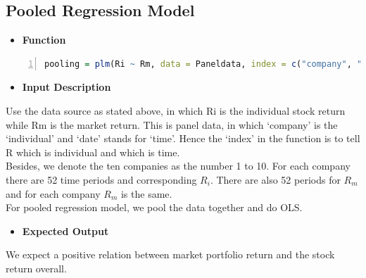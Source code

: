     \subsection{Pooled Regression Model}
    \begin{itemize}
    \item \textbf{Function}
    \end{itemize}
    \begin{lstlisting}[language=R,numbers=left, numberstyle=\normalsize]
    pooling = plm(Ri ~ Rm, data = Paneldata, index = c("company", "date"), model = "pooling")
    \end{lstlisting}
    \begin{itemize}
    \item \textbf{Input Description}
    \end{itemize}
    \noindent Use the data source as stated above, in which Ri is the individual stock return while Rm is the market return. This is panel data, in which `company' is the `individual' and `date' stands for `time'. Hence the `index' in the function is to tell R which is individual and which is time.\\

    Besides, we denote the ten companies as the number 1 to 10. For each company there are 52 time periods and corresponding $R_{i}$. There are also 52 periods for $R_{m}$ and for each company $R_{m}$ is the same.\\

    For pooled regression model, we pool the data together and do OLS.\\


    \begin{itemize}
    \item \textbf{Expected Output}
    \end{itemize}
    We expect a positive relation between market portfolio return and the stock return overall.\\



